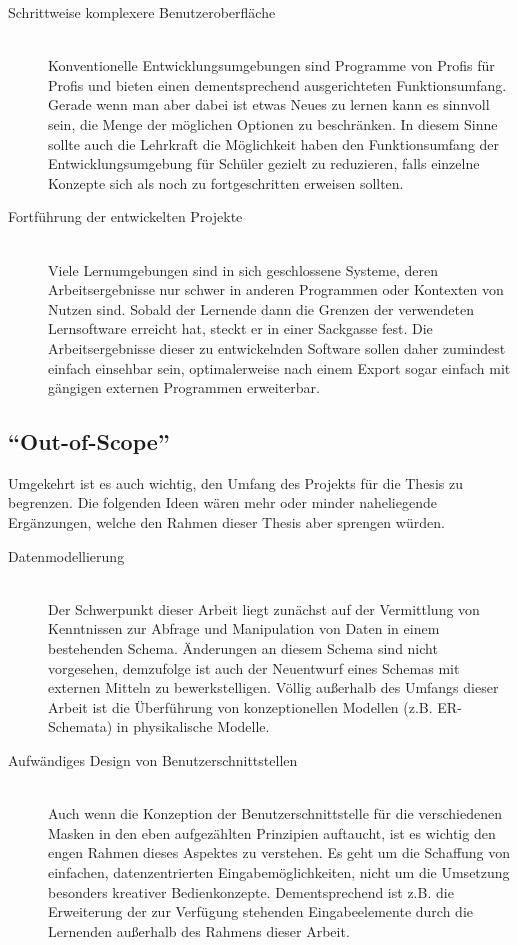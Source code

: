 \documentclass[paper=a4,fontsize=11pt,parskip=half]{scrartcl}
\begin{document}
\begin{description}
\item[Schrittweise komplexere Benutzeroberfläche] \hfill \\
  Konventionelle Entwicklungsumgebungen sind Programme von Profis für Profis und bieten einen dementsprechend ausgerichteten Funktionsumfang. Gerade wenn man aber dabei ist etwas Neues zu lernen kann es sinnvoll sein, die Menge der möglichen Optionen zu beschränken. In diesem Sinne sollte auch die Lehrkraft die Möglichkeit haben den Funktionsumfang der Entwicklungsumgebung für Schüler gezielt zu reduzieren, falls einzelne Konzepte sich als noch zu fortgeschritten erweisen sollten.
\item[Fortführung der entwickelten Projekte] \hfill \\
  Viele Lernumgebungen sind in sich geschlossene Systeme, deren Arbeitsergebnisse nur schwer in anderen Programmen oder Kontexten von Nutzen sind. Sobald der Lernende dann die Grenzen der verwendeten Lernsoftware erreicht hat, steckt er in einer Sackgasse fest. Die Arbeitsergebnisse dieser zu entwickelnden Software sollen daher zumindest einfach einsehbar sein, optimalerweise nach einem Export sogar einfach mit gängigen externen Programmen erweiterbar.
  
  
\end{description}

\subsection{``Out-of-Scope''}
\label{sec:out-of-scope}

Umgekehrt ist es auch wichtig, den Umfang des Projekts für die Thesis zu begrenzen. Die folgenden Ideen wären mehr oder minder naheliegende Ergänzungen, welche den Rahmen dieser Thesis aber sprengen würden.

\begin{description}
\item[Datenmodellierung] \hfill \\
  Der Schwerpunkt dieser Arbeit liegt zunächst auf der Vermittlung von Kenntnissen zur Abfrage und Manipulation von Daten in einem bestehenden Schema. Änderungen an diesem Schema sind nicht vorgesehen, demzufolge ist auch der Neuentwurf eines Schemas mit externen Mitteln zu bewerkstelligen. Völlig außerhalb des Umfangs dieser Arbeit ist die Überführung von konzeptionellen Modellen (z.B. ER-Schemata) in physikalische Modelle.
\item[Aufwändiges Design von Benutzerschnittstellen] \hfill \\
  Auch wenn die Konzeption der Benutzerschnittstelle für die verschiedenen Masken in den eben aufgezählten Prinzipien auftaucht, ist es wichtig den engen Rahmen dieses Aspektes zu verstehen. Es geht um die Schaffung von einfachen, datenzentrierten Eingabemöglichkeiten, nicht um die Umsetzung besonders kreativer Bedienkonzepte. Dementsprechend ist z.B. die Erweiterung der zur Verfügung stehenden Eingabeelemente durch die Lernenden außerhalb des Rahmens dieser Arbeit.
\end{description}
\end{document}
